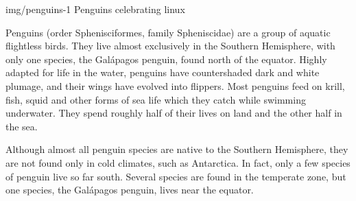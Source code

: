 \documentclass[oneside]{modern}
\begin{document}
  \leftimage
    {img/penguins-1}
    {Penguins celebrating linux}

  Penguins (order Sphenisciformes, family Spheniscidae) are a group of aquatic flightless birds.
  They live almost exclusively in the Southern Hemisphere,
  with only one species, the Galápagos penguin, found north of the equator.
  Highly adapted for life in the water, penguins have countershaded dark and
  white plumage, and their wings have evolved into flippers.
  Most penguins feed on krill, fish, squid and other forms of sea
  life which they catch while swimming underwater.
  They spend roughly half of their lives on land and the other half in the sea.


  Although almost all penguin species are native to the Southern Hemisphere,
  they are not found only in cold climates, such as Antarctica.
  In fact, only a few species of penguin live so far south.
  Several species are found in the temperate zone, but one species,
  the Galápagos penguin, lives near the equator.
\end{document}
